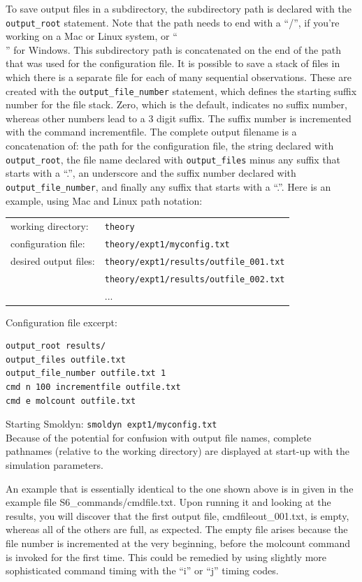 \documentclass {book}
\newcommand {\ttt} {\texttt}
\begin{document}
To save output files in a subdirectory, the subdirectory path is declared with the \ttt{output\_root} statement. Note that the path needs to end with a ``/'', if you're working on a Mac or Linux system, or ``\\'' for Windows. This subdirectory path is concatenated on the end of the path that was used for the configuration file. It is possible to save a stack of files in which there is a separate file for each of many sequential observations. These are created with the \ttt{output\_file\_number} statement, which defines the starting suffix number for the file stack. Zero, which is the default, indicates no suffix number, whereas other numbers lead to a 3 digit suffix. The suffix number is incremented with the command incrementfile. The complete output filename is a concatenation of: the path for the configuration file, the string declared with \ttt{output\_root}, the file name declared with \ttt{output\_files} minus any suffix that starts with a ``.'', an underscore and the suffix number declared with \ttt{output\_file\_number}, and finally any suffix that starts with a ``.''. Here is an example, using Mac and Linux path notation:

\begin{longtable}[c]{ll}
working directory: & \ttt{theory}\\
configuration file: & \ttt{theory/expt1/myconfig.txt}\\
desired output files: & \ttt{theory/expt1/results/outfile\_001.txt}\\
 & \ttt{theory/expt1/results/outfile\_002.txt}\\
 & ...
\end{longtable}

Configuration file excerpt:
\begin{lstlisting}[style=SSAC]
output_root results/
output_files outfile.txt
output_file_number outfile.txt 1
cmd n 100 incrementfile outfile.txt
cmd e molcount outfile.txt
\end{lstlisting}
Starting Smoldyn: \ttt{smoldyn expt1/myconfig.txt}\\

Because of the potential for confusion with output file names, complete pathnames (relative to the working directory) are displayed at start-up with the simulation parameters.

An example that is essentially identical to the one shown above is in given in the example file S6\_commands/cmdfile.txt. Upon running it and looking at the results, you will discover that the first output file, cmdfileout\_001.txt, is empty, whereas all of the others are full, as expected. The empty file arises because the file number is incremented at the very beginning, before the molcount command is invoked for the first time. This could be remedied by using slightly more sophisticated command timing with the ``i'' or ``j'' timing codes.
\end{document}
